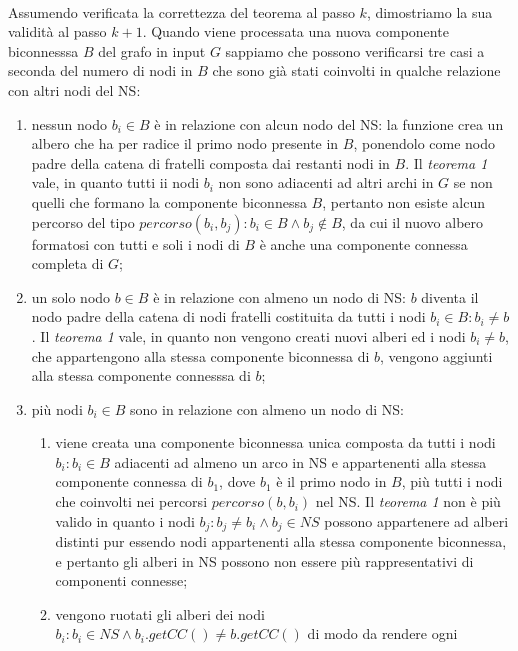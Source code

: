\documentclass[a4paper,11pt]{report}
\begin{document}
\paragraph{}
Assumendo verificata la correttezza del teorema al passo $k$,  dimostriamo la sua validità al passo $k+1$. Quando viene processata una nuova
componente biconnesssa $B$ del grafo in input $G$
sappiamo che possono verificarsi tre casi a seconda del numero di nodi in $B$ che sono già stati coinvolti in qualche relazione con altri
nodi del NS:
\begin{enumerate}
 \item nessun nodo $b_i\in B$ è in relazione con alcun nodo del NS: la funzione crea un albero che ha per radice il primo nodo presente in
$B$, ponendolo come nodo padre
della catena di fratelli composta dai restanti nodi in $B$. Il \emph{teorema 1} vale, in quanto tutti ii nodi $b_i$ non sono adiacenti ad
altri archi in $G$ se non quelli che formano la componente 
biconnessa $B$, pertanto non esiste alcun percorso del tipo $percorso\left(b_i,b_j\right):b_i\in B \wedge b_j\notin B$, da cui il nuovo
albero formatosi con tutti e soli i nodi di $B$ è anche una 
componente connessa completa di $G$;
 \item un solo nodo $b\in B$ è in relazione con almeno un nodo di NS: $b$ diventa il nodo padre della catena di nodi fratelli costituita da
tutti i nodi $b_i\in B: b_i\neq b$. 
Il \emph{teorema 1} vale, in quanto non vengono creati nuovi alberi ed i nodi $b_i\neq b$, che appartengono alla stessa componente
biconnessa di $b$, vengono aggiunti
alla stessa componente connesssa di $b$;
\item più nodi $b_i\in B$ sono in relazione con almeno un nodo di NS: 
 \begin{enumerate}
  \item viene creata una componente biconnessa unica composta da tutti i nodi $b_i:b_i\in B$ adiacenti ad almeno un arco in NS e
appartenenti alla stessa componente connessa di $b_1$,
dove $b_1$ è il primo nodo in $B$, più tutti i nodi che coinvolti nei percorsi $percorso\left(b,b_i\right)$ nel NS. Il \emph{teorema 1} non
è più valido in quanto i nodi
 $b_j:b_j\neq b_i\wedge b_j\in NS$ possono appartenere ad alberi distinti pur essendo nodi appartenenti alla stessa componente biconnessa, e
pertanto gli alberi in NS possono 
non essere più rappresentativi di componenti connesse;
  \item vengono ruotati gli alberi dei nodi $b_i:b_i\in NS \wedge b_i.getCC\left(\right)\neq b.getCC\left(\right)$ di modo da rendere ogni

\end{enumerate}
\end{enumerate}
\end{document}
